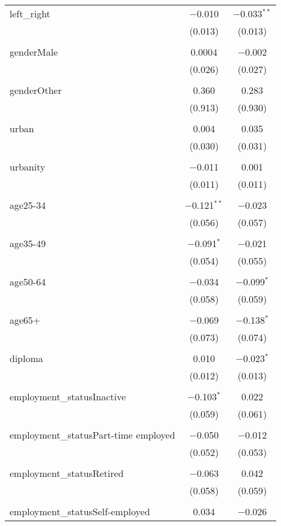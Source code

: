 \begin{tabular}{@{\extracolsep{5pt}}lcc}
 left\_right & $-$0.010 & $-$0.033$^{**}$ \\ 
  & (0.013) & (0.013) \\ 
  & & \\ 
 genderMale & 0.0004 & $-$0.002 \\ 
  & (0.026) & (0.027) \\ 
  & & \\ 
 genderOther & 0.360 & 0.283 \\ 
  & (0.913) & (0.930) \\ 
  & & \\ 
 urban & 0.004 & 0.035 \\ 
  & (0.030) & (0.031) \\ 
  & & \\ 
 urbanity & $-$0.011 & 0.001 \\ 
  & (0.011) & (0.011) \\ 
  & & \\ 
 age25-34 & $-$0.121$^{**}$ & $-$0.023 \\ 
  & (0.056) & (0.057) \\ 
  & & \\ 
 age35-49 & $-$0.091$^{*}$ & $-$0.021 \\ 
  & (0.054) & (0.055) \\ 
  & & \\ 
 age50-64 & $-$0.034 & $-$0.099$^{*}$ \\ 
  & (0.058) & (0.059) \\ 
  & & \\ 
 age65+ & $-$0.069 & $-$0.138$^{*}$ \\ 
  & (0.073) & (0.074) \\ 
  & & \\ 
 diploma & 0.010 & $-$0.023$^{*}$ \\ 
  & (0.012) & (0.013) \\ 
  & & \\ 
 employment\_statusInactive & $-$0.103$^{*}$ & 0.022 \\ 
  & (0.059) & (0.061) \\ 
  & & \\ 
 employment\_statusPart-time employed & $-$0.050 & $-$0.012 \\ 
  & (0.052) & (0.053) \\ 
  & & \\ 
 employment\_statusRetired & $-$0.063 & 0.042 \\ 
  & (0.058) & (0.059) \\ 
  & & \\ 
 employment\_statusSelf-employed & 0.034 & $-$0.026 \\ 

\end{tabular}
